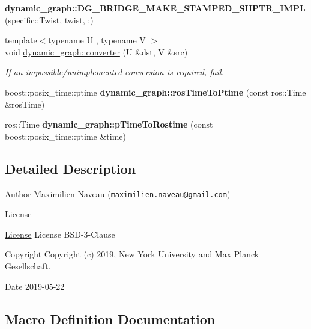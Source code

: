 \begin{DoxyCompactItemize}
{\bfseries dynamic\+\_\+graph\+::\+D\+G\+\_\+\+B\+R\+I\+D\+G\+E\+\_\+\+M\+A\+K\+E\+\_\+\+S\+T\+A\+M\+P\+E\+D\+\_\+\+S\+H\+P\+T\+R\+\_\+\+I\+M\+PL} (specific\+::\+Twist, twist, ;)
\item 
{\footnotesize template$<$typename U , typename V $>$ }\\void \hyperlink{namespacedynamic__graph_a38ff488b8b21c0b4f4d7f44572fa4ee5}{dynamic\+\_\+graph\+::converter} (U \&dst, V \&src)
\begin{DoxyCompactList}\small\item\em If an impossible/unimplemented conversion is required, fail. \end{DoxyCompactList}\item 
\mbox{\label{namespacedynamic__graph_ae79d27ce6f0c5bc0788a4fb4bd33f363}} 
boost\+::posix\+\_\+time\+::ptime {\bfseries dynamic\+\_\+graph\+::ros\+Time\+To\+Ptime} (const ros\+::\+Time \&ros\+Time)
\item 
\mbox{\label{namespacedynamic__graph_a3d2b2b3f2e9363d80c0abb64c4408e66}} 
ros\+::\+Time {\bfseries dynamic\+\_\+graph\+::p\+Time\+To\+Rostime} (const boost\+::posix\+\_\+time\+::ptime \&time)
\end{DoxyCompactItemize}


\subsection{Detailed Description}
\begin{DoxyAuthor}{Author}
Maximilien Naveau (\href{mailto:maximilien.naveau@gmail.com}{\tt maximilien.\+naveau@gmail.\+com}) 
\end{DoxyAuthor}
\begin{DoxyRefDesc}{License}
\item[\hyperlink{license__license000018}{License}]License B\+S\+D-\/3-\/\+Clause \end{DoxyRefDesc}
\begin{DoxyCopyright}{Copyright}
Copyright (c) 2019, New York University and Max Planck Gesellschaft. 
\end{DoxyCopyright}
\begin{DoxyDate}{Date}
2019-\/05-\/22 
\end{DoxyDate}


\subsection{Macro Definition Documentation}
\mbox{\label{converter_8hh_a9de018e745b4235be09aaab744557770}} 
